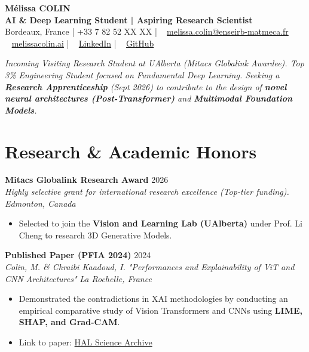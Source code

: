 \documentclass[10pt, letterpaper]{article}
\newcommand{\entry}[4]{
  \noindent \textbf{#1} \hfill #2 \\
  \textit{#3} \hfill \textit{#4} \par 
}
\providecommand{\myphone}{+33 7 82 52 XX XX}
\begin{document}
\begin{center}
    {\fontsize{22}{22}\selectfont \textbf{Mélissa COLIN}} \\[5pt] 
    {\large \textbf{AI \& Deep Learning Student | Aspiring Research Scientist}} \\[5pt] 
    
    \small{ 
    \faMapMarker* Bordeaux, France \quad | \quad \faPhone* \myphone{} \quad | \quad \faEnvelope~ \href{mailto:melissa.colin@enseirb-matmeca.fr}{melissa.colin@enseirb-matmeca.fr} \\
    \faGlobe~ \href{https://melissacolin.ai}{melissacolin.ai} \quad | \quad \faLinkedin~ \href{https://www.linkedin.com/in/melissacolin/}{LinkedIn} \quad | \quad \faGithub~ \href{https://github.com/melissa-colin}{GitHub}
    }
\end{center}

\vspace{2pt}
{\small
\textit{Incoming Visiting Research Student at UAlberta (Mitacs Globalink Awardee). Top 3\% Engineering Student focused on Fundamental Deep Learning. Seeking a \textbf{Research Apprenticeship} (Sept 2026) to contribute to the design of \textbf{novel neural architectures (Post-Transformer)} and \textbf{Multimodal Foundation Models}.}
}

\section{Research \& Academic Honors}

\entry{Mitacs Globalink Research Award}{2026}{Highly selective grant for international research excellence (Top-tier funding).}{Edmonton, Canada}
\begin{itemize}
    \item Selected to join the \textbf{Vision and Learning Lab (UAlberta)} under Prof. Li Cheng to research 3D Generative Models.
\end{itemize}

\vspace{6pt}

\entry{Published Paper (PFIA 2024)}{2024}{Colin, M. \& Chraibi Kaadoud, I. "Performances and Explainability of ViT and CNN Architectures"}{La Rochelle, France}
\begin{itemize}
    \item Demonstrated the contradictions in XAI methodologies by conducting an empirical comparative study of Vision Transformers and CNNs using \textbf{LIME, SHAP, and Grad-CAM}.
    \item Link to paper: \href{https://hal.science/hal-04641791}{HAL Science Archive}
\end{itemize}
\end{document}
